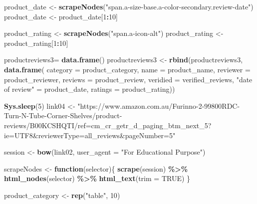\documentclass[
]{article}
\newenvironment{Shaded}{\begin{snugshade}}{\end{snugshade}}
\newcommand{\AttributeTok}[1]{\textcolor[rgb]{0.13,0.29,0.53}{#1}}
\newcommand{\ConstantTok}[1]{\textcolor[rgb]{0.56,0.35,0.01}{#1}}
\newcommand{\ControlFlowTok}[1]{\textcolor[rgb]{0.13,0.29,0.53}{\textbf{#1}}}
\newcommand{\DecValTok}[1]{\textcolor[rgb]{0.00,0.00,0.81}{#1}}
\newcommand{\FunctionTok}[1]{\textcolor[rgb]{0.13,0.29,0.53}{\textbf{#1}}}
\newcommand{\NormalTok}[1]{#1}
\newcommand{\OtherTok}[1]{\textcolor[rgb]{0.56,0.35,0.01}{#1}}
\newcommand{\SpecialCharTok}[1]{\textcolor[rgb]{0.81,0.36,0.00}{\textbf{#1}}}
\newcommand{\StringTok}[1]{\textcolor[rgb]{0.31,0.60,0.02}{#1}}
\begin{document}
\begin{Shaded}
\begin{Highlighting}[]
\NormalTok{  product\_date }\OtherTok{\textless{}{-}} \FunctionTok{scrapeNodes}\NormalTok{(}\StringTok{"span.a{-}size{-}base.a{-}color{-}secondary.review{-}date"}\NormalTok{)}
\NormalTok{  product\_date }\OtherTok{\textless{}{-}}\NormalTok{ product\_date[}\DecValTok{1}\SpecialCharTok{:}\DecValTok{10}\NormalTok{]}
  
\NormalTok{  product\_rating }\OtherTok{\textless{}{-}} \FunctionTok{scrapeNodes}\NormalTok{(}\StringTok{"span.a{-}icon{-}alt"}\NormalTok{)}
\NormalTok{  product\_rating }\OtherTok{\textless{}{-}}\NormalTok{ product\_rating[}\DecValTok{1}\SpecialCharTok{:}\DecValTok{10}\NormalTok{]}
  
\NormalTok{  productreviews3}\OtherTok{=} \FunctionTok{data.frame}\NormalTok{()}
\NormalTok{  productreviews3 }\OtherTok{\textless{}{-}} \FunctionTok{rbind}\NormalTok{(productreviews3, }\FunctionTok{data.frame}\NormalTok{(}
                      \AttributeTok{category =}\NormalTok{ product\_category,}
                      \AttributeTok{name =}\NormalTok{ product\_name,}
                      \AttributeTok{reviewer =}\NormalTok{ product\_reviewer,}
                      \AttributeTok{reviews =}\NormalTok{ product\_review,}
                      \AttributeTok{veridied =}\NormalTok{ verified\_reviews,}
                      \StringTok{"date of review"} \OtherTok{=}\NormalTok{ product\_date,}
                      \AttributeTok{ratings =}\NormalTok{ product\_rating))}
  
   \FunctionTok{Sys.sleep}\NormalTok{(}\DecValTok{5}\NormalTok{)}
\NormalTok{link04 }\OtherTok{\textless{}{-}} \StringTok{"https://www.amazon.com.au/Furinno{-}2{-}99800RDC{-}Turn{-}N{-}Tube{-}Corner{-}Shelves/product{-}reviews/B00KCSHQTI/ref=cm\_cr\_getr\_d\_paging\_btm\_next\_5?ie=UTF8\&reviewerType=all\_reviews\&pageNumber=5"}


\NormalTok{  session }\OtherTok{\textless{}{-}} \FunctionTok{bow}\NormalTok{(link02,}
               \AttributeTok{user\_agent =} \StringTok{"For Educational Purpose"}\NormalTok{)}

\NormalTok{  scrapeNodes }\OtherTok{\textless{}{-}} \ControlFlowTok{function}\NormalTok{(selector)\{}
    \FunctionTok{scrape}\NormalTok{(session) }\SpecialCharTok{\%\textgreater{}\%}
      \FunctionTok{html\_nodes}\NormalTok{(selector) }\SpecialCharTok{\%\textgreater{}\%}
      \FunctionTok{html\_text}\NormalTok{(}\AttributeTok{trim =} \ConstantTok{TRUE}\NormalTok{)}
\NormalTok{  \}}

\NormalTok{  product\_category }\OtherTok{\textless{}{-}} \FunctionTok{rep}\NormalTok{(}\StringTok{"table"}\NormalTok{, }\DecValTok{10}\NormalTok{)}


\end{Highlighting}
\end{Shaded}
\end{document}
